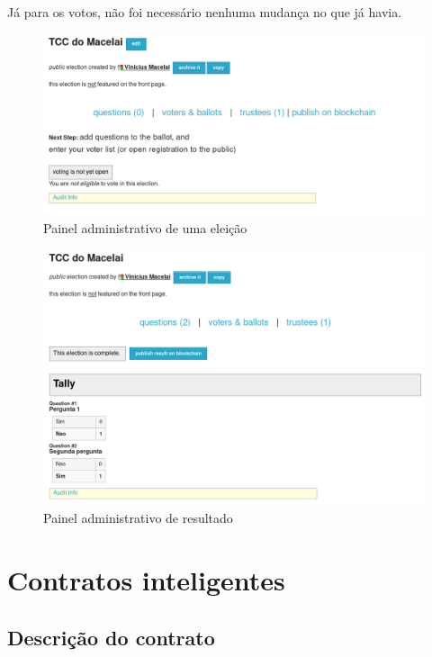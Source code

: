 \documentclass{ufsctex/ufsctex}
\begin{document}
Já para os votos, não foi necessário nenhuma mudança no que já havia.


\begin{figure}[H]
	\centering
	\includegraphics[width=\linewidth]{helios-1}
	\caption{Painel administrativo de uma eleição}
	\label{fig:helios-1}
\end{figure}

\begin{figure}[H]
	\centering
	\includegraphics[width=\linewidth]{helios-2}
	\caption{Painel administrativo de resultado}
	\label{fig:helios-2}
\end{figure}



\section{Contratos inteligentes}

\subsection{Descrição do contrato}
\end{document}
